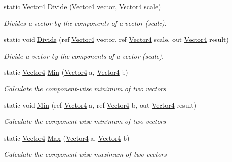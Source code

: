 \begin{DoxyCompactItemize}
static \hyperlink{struct_open_t_k_1_1_vector4}{Vector4} \hyperlink{struct_open_t_k_1_1_vector4_a99cc7adf29bdda4c2187633fdc5c52e7}{Divide} (\hyperlink{struct_open_t_k_1_1_vector4}{Vector4} vector, \hyperlink{struct_open_t_k_1_1_vector4}{Vector4} scale)
\begin{DoxyCompactList}\small\item\em Divides a vector by the components of a vector (scale). \end{DoxyCompactList}\item 
static void \hyperlink{struct_open_t_k_1_1_vector4_adeeaa875c098cc67411cd512540fdc65}{Divide} (ref \hyperlink{struct_open_t_k_1_1_vector4}{Vector4} vector, ref \hyperlink{struct_open_t_k_1_1_vector4}{Vector4} scale, out \hyperlink{struct_open_t_k_1_1_vector4}{Vector4} result)
\begin{DoxyCompactList}\small\item\em Divide a vector by the components of a vector (scale). \end{DoxyCompactList}\item 
static \hyperlink{struct_open_t_k_1_1_vector4}{Vector4} \hyperlink{struct_open_t_k_1_1_vector4_ae4c4586c94350f232f547884742fcbcc}{Min} (\hyperlink{struct_open_t_k_1_1_vector4}{Vector4} a, \hyperlink{struct_open_t_k_1_1_vector4}{Vector4} b)
\begin{DoxyCompactList}\small\item\em Calculate the component-\/wise minimum of two vectors \end{DoxyCompactList}\item 
static void \hyperlink{struct_open_t_k_1_1_vector4_aae403742af993919fd957f544294967b}{Min} (ref \hyperlink{struct_open_t_k_1_1_vector4}{Vector4} a, ref \hyperlink{struct_open_t_k_1_1_vector4}{Vector4} b, out \hyperlink{struct_open_t_k_1_1_vector4}{Vector4} result)
\begin{DoxyCompactList}\small\item\em Calculate the component-\/wise minimum of two vectors \end{DoxyCompactList}\item 
static \hyperlink{struct_open_t_k_1_1_vector4}{Vector4} \hyperlink{struct_open_t_k_1_1_vector4_a2ef6ee97934b12d84767a3e4f631ccc4}{Max} (\hyperlink{struct_open_t_k_1_1_vector4}{Vector4} a, \hyperlink{struct_open_t_k_1_1_vector4}{Vector4} b)
\begin{DoxyCompactList}\small\item\em Calculate the component-\/wise maximum of two vectors \end{DoxyCompactList}\item 

\end{DoxyCompactItemize}
